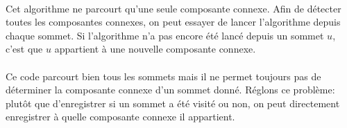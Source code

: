 \documentclass{article}
\begin{document}


\paragraph{}
Cet algorithme ne parcourt qu'une seule composante connexe. Afin de détecter toutes les composantes connexes, on peut essayer de lancer l'algorithme depuis chaque sommet. Si l'algorithme n'a pas encore été lancé depuis un sommet $u$, c'est que $u$ appartient à une nouvelle composante connexe.



\paragraph{}
Ce code parcourt bien tous les sommets mais il ne permet toujours pas de déterminer la composante connexe d'un sommet donné. Réglons ce problème: plutôt que d'enregistrer si un sommet a été visité ou non, on peut directement enregistrer à quelle composante connexe il appartient.


\end{document}
